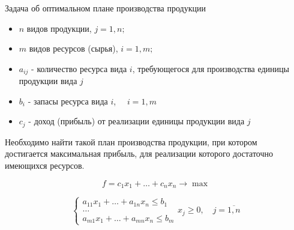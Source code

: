\documentclass[17pt]{extarticle}
\begin{document}
\begin{definition}
    Задача об оптимальном плане производства продукции
    \begin{itemize}
        \item $n$ видов продукции, $j = 1, n;$
        \item $m$ видов ресурсов (сырья), $i = 1, m;$
        \item $a_{ij}$ - количество ресурса вида $i$, требующегося для производства единицы продукции вида $j$
        \item $b_i$ - запасы ресурса вида $i$, $\quad i = 1, m$
        \item $c_j$ - доход (прибыль) от реализации единицы продукции вида $j$
    \end{itemize}
    Необходимо найти такой план производства продукции, при котором \\ достигается максимальная прибыль,
    для реализации которого достаточно имеющихся ресурсов.

    \[
        f = c_1 x_1 + \ldots + c_n x_n \rightarrow \max
    \]

    \[
        \begin{cases}
            a_{11} x_1 + \ldots + a_{1n} x_n \leq b_1 \\
            \ldots                                    \\
            a_{m1} x_1 + \ldots + a_{mn} x_n \leq b_m
        \end{cases} x_j \geq 0, \quad j = \overline{1, n}
    \]
\end{definition}
\end{document}
